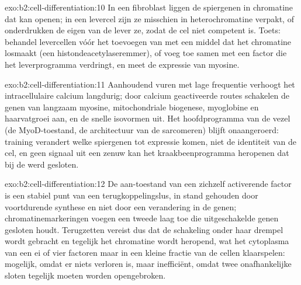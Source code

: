 \begin{solution}{exo:b2:cell-differentiation:10}
In een fibroblast liggen de spiergenen in chromatine dat  kan openen;
in een levercel zijn ze misschien in heterochromatine verpakt, of
onderdrukken de eigen  van de lever ze, zodat de cel niet
competent is. Toets: behandel levercellen vóór het toevoegen van  met
een middel dat het chromatine losmaakt (een histondeacetylaseremmer), of
voeg  toe samen met een factor die het leverprogramma verdringt, en
meet de expressie van myosine.
\end{solution}

\begin{solution}{exo:b2:cell-differentiation:11}
Aanhoudend vuren met lage frequentie verhoogt het intracellulaire calcium
langdurig; door calcium geactiveerde routes schakelen de genen van
langzaam myosine, mitochondriale biogenese, myoglobine en haarvatgroei aan,
en de snelle isovormen uit. Het hoofdprogramma van de vezel (de
MyoD-toestand, de architectuur van de sarcomeren) blijft onaangeroerd:
training verandert welke spiergenen tot expressie komen, niet de identiteit
van de cel, en geen signaal uit een zenuw kan het kraakbeenprogramma
heropenen dat bij de  werd gesloten.
\end{solution}

\begin{solution}{exo:b2:cell-differentiation:12}
De aan-toestand van een zichzelf activerende factor is een stabiel punt van
een terugkoppelingslus, in stand gehouden door voortdurende synthese en niet
door een verandering in de genen; chromatinemarkeringen voegen een tweede
laag toe die uitgeschakelde genen gesloten houdt. Terugzetten vereist dus
dat de schakeling onder haar drempel wordt gebracht en tegelijk het
chromatine wordt heropend, wat het cytoplasma van een ei of vier factoren
maar in een kleine fractie van de cellen klaarspelen: mogelijk, omdat er
niets verloren is, maar inefficiënt, omdat twee onafhankelijke sloten
tegelijk moeten worden opengebroken.
\end{solution}

